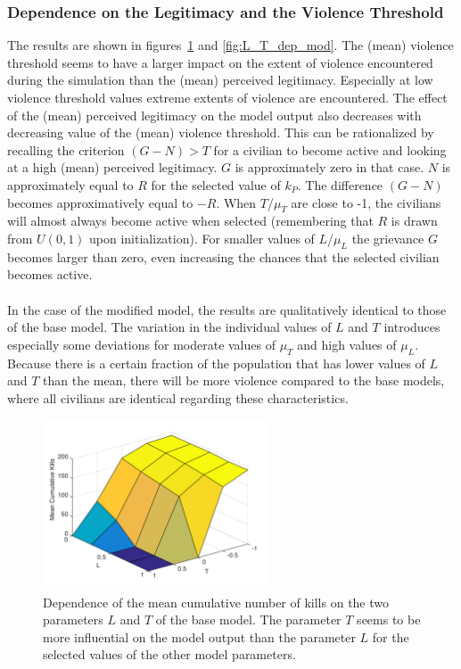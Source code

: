\documentclass[11pt]{article}
\begin{document}
\subsubsection{Dependence on the Legitimacy and the Violence Threshold}
The results are shown in figures~\ref{fig:L_T_dep_base} and \ref{fig:L_T_dep_mod}. The (mean) violence threshold seems to have a larger impact on the extent of violence encountered during the simulation than the (mean) perceived legitimacy. Especially at low violence threshold values extreme extents of violence are encountered. The effect of the (mean) perceived legitimacy on the model output also decreases with decreasing value of the (mean) violence threshold. This can be rationalized by recalling the criterion $(G-N)>T$ for a civilian to become active and looking at a high (mean) perceived legitimacy. $G$ is approximately zero in that case. $N$ is approximately equal to $R$ for the selected value of $k_P$. The difference $(G-N)$ becomes approximatively equal to $-R$. When $T$/$\mu_T$ are close to -1, the civilians will almost always become active when selected (remembering that $R$ is drawn from $U(0,1)$ upon initialization). For smaller values of $L$/$\mu_L$ the grievance $G$ becomes larger than zero, even increasing the chances that the selected civilian becomes active.\\
\\
In the case of the modified model, the results are qualitatively identical to those of the base model. The variation in the individual values of $L$ and $T$ introduces especially some deviations for moderate values of $\mu_T$ and high values of $\mu_L$. Because there is a certain fraction of the population that has lower values of $L$ and $T$ than the mean, there will be more violence compared to the base models, where all civilians are identical regarding these characteristics.
\begin{figure}[!htbp]
	\centering
		\includegraphics[width=0.6\textwidth]{../../code/base_model/L_T_dep_mean.png}
	\caption{Dependence of the mean cumulative number of kills on the two parameters $L$ and $T$ of the base model. The parameter $T$ seems to be more influential on the model output than the parameter $L$ for the selected values of the other model parameters.}
	\label{fig:L_T_dep_base}
\end{figure}
\end{document}
